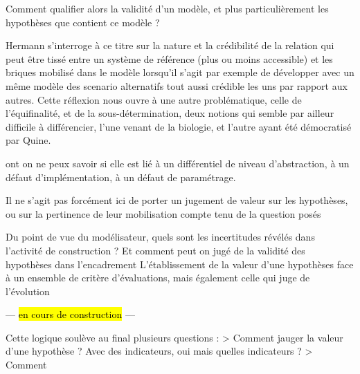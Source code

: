 


Comment qualifier alors la validité d'un modèle, et plus particulièrement les hypothèses que contient ce modèle ?

Hermann s'interroge à ce titre sur la nature et la crédibilité de la relation qui peut être tissé entre un système de référence (plus ou moins accessible) et les briques mobilisé dans le modèle lorsqu'il s'agit par exemple de développer avec un même modèle des scenario alternatifs tout aussi crédible les uns par rapport aux autres. Cette réflexion nous ouvre à une autre problématique, celle de l'équifinalité, et de la sous-détermination, deux notions qui semble par ailleur difficile à différencier, l'une venant de la biologie, et l'autre ayant été démocratisé par Quine.



\autocite{Cottineau2014a}

ont on ne peux savoir si elle est lié à un différentiel de niveau d'abstraction, à un défaut d'implémentation, à un défaut de paramétrage.

Il ne s'agit pas forcément ici de porter un jugement de valeur sur les hypothèses, ou sur la pertinence de leur mobilisation compte tenu de la question posés


Du point de vue du modélisateur, quels sont les incertitudes révélés dans l'activité de construction ? Et comment peut on jugé de la validité des hypothèses dans l'encadrement L'établissement de la valeur d'une hypothèses face à un ensemble de critère d'évaluations, mais également celle qui juge de l'évolution

--- \hl{en cours de construction} ---

Cette logique soulève au final plusieurs questions :
> Comment jauger la valeur d'une hypothèse ? Avec des indicateurs, oui mais quelles indicateurs ?
> Comment



